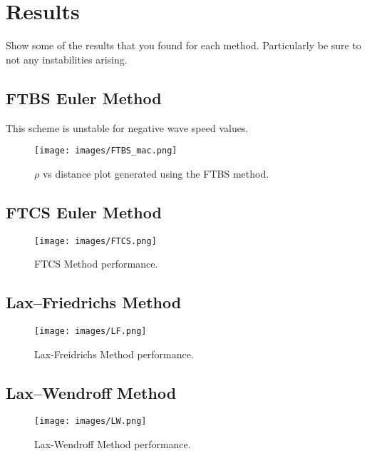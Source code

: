 \documentclass{article}
\begin{document}
\section{Results}
Show some of the results that you found for each method.  Particularly be sure to not any instabilities arising.

\subsection{FTBS Euler Method}

This scheme is unstable for negative wave speed values.

\begin{figure}[H]
\begin{center}
\texttt{[image: images/FTBS\_mac.png]}
\caption{$\rho$ vs distance plot generated using the FTBS method.}
\end{center}
\end{figure}

\subsection{FTCS Euler Method}

\begin{figure}[H]
\begin{center}
\texttt{[image: images/FTCS.png]}
\caption{FTCS Method performance.}
\end{center}
\end{figure}

\subsection{Lax–Friedrichs Method}

\begin{figure}[H]
\begin{center}
\texttt{[image: images/LF.png]}
\caption{Lax-Freidrichs Method performance.}
\end{center}
\end{figure}

\subsection{Lax–Wendroff Method}

\begin{figure}[H]
\begin{center}
\texttt{[image: images/LW.png]}
\caption{Lax-Wendroff Method performance.}
\end{center}
\end{figure}
\end{document}
